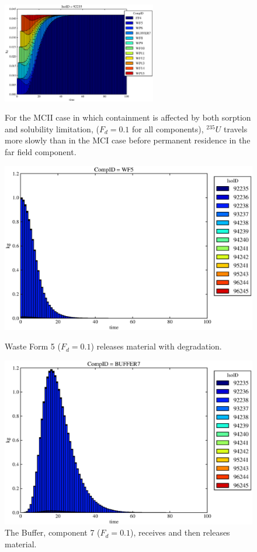 \begin{figure}[ht]
\centering
\includegraphics[width=0.6\textwidth]{./chapters/demonstration/base/mcIII.eps}
\caption[$^{235}U$ residence. Mixed Cell Coupled Sorption and Solubility Limitation.]{
For the MCII case in which containment is affected by both sorption and solubility limitation, 
($F_{d}=0.1$ for all components), $^{235}U$ travels more slowly than in the MCI case 
before permanent residence in the far field component.
}
\label{fig:mcIIIall}
\begin{minipage}[b]{0.45\linewidth}

  \includegraphics[width=\textwidth]{./chapters/demonstration/base/mcIII1.eps}
  \caption[MCI Waste Form Contaminants.]{
    Waste Form 5 ($F_d = 0.1$) releases material with degradation. 
    }
  \label{fig:mcIIIwf5}
  
  \includegraphics[width=\textwidth]{./chapters/demonstration/base/mcIII3.eps}
  \caption[Case MCI Buffer Contaminants]{
    The Buffer, component 7 ($F_d=0.1$), receives and then releases material.
    }
  \label{fig:mcIIIbuff}


\end{minipage}
\end{figure}
